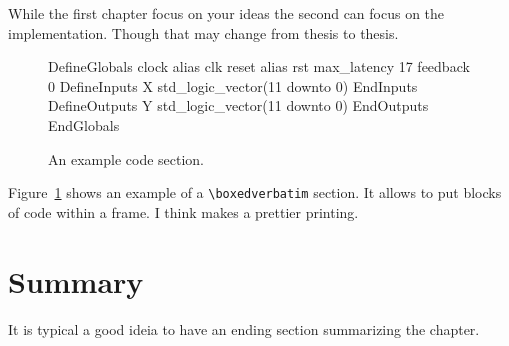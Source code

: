 While the first chapter focus on your ideas the second can focus on the implementation. Though that may change from thesis to thesis.

\begin{figure}
\begin{boxedverbatim}
DefineGlobals
   clock   alias   clk
   reset   alias   rst
   max_latency     17
   feedback        0
   DefineInputs
      X   std_logic_vector(11 downto 0)
   EndInputs
   DefineOutputs
      Y   std_logic_vector(11 downto 0)
   EndOutputs
EndGlobals
\end{boxedverbatim}
\caption{An example code section.}
\label{chp4:img}
\end{figure}

Figure~\ref{chp4:img} shows an example of a \verb"\boxedverbatim" section. It allows to put blocks of code within a frame. I think makes a prettier printing.

\section{Summary}

It is typical a good ideia to have an ending section summarizing the chapter.

\cleardoublepage

